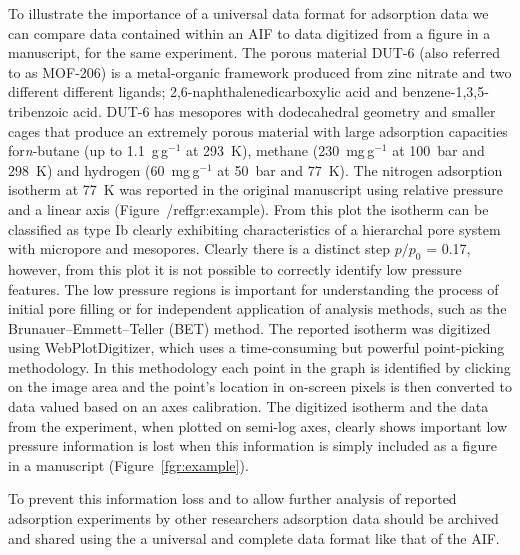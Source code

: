 \documentclass[journal=langd5,manuscript=article]{achemso}
\begin{document}
To illustrate the importance of a universal data format for adsorption data we can compare data contained within an AIF to data digitized from a figure in a manuscript, for the same experiment.
The porous material DUT-6 (also referred to as MOF-206) is a metal-organic framework produced from zinc nitrate and two different different ligands; 2,6-naphthalenedicarboxylic acid and benzene-1,3,5-tribenzoic acid.\cite{10.1002/anie.200904599}
DUT-6 has mesopores with dodecahedral geometry and smaller cages that produce an extremely porous material with large adsorption capacities for\textit{n}-butane (up to 1.1~g$\,$g$^{-1}$ at 293~K),  methane (230~mg$\,$g$^{-1}$ at 100~bar and 298~K) and hydrogen (60~mg$\,$g$^{-1}$ at 50~bar and 77~K).
The nitrogen adsorption isotherm at 77~K was reported in the original manuscript using relative pressure and a linear axis (Figure~/ref{fgr:example}).
From this plot the isotherm can be classified  as  type  Ib clearly exhibiting characteristics of a hierarchal pore system with micropore and mesopores.
Clearly there is a distinct step $p/p_0$ = 0.17, however, from this plot it is not possible to correctly identify low pressure features.
The low pressure regions is important for understanding the process of initial pore filling or for independent application of analysis methods, such as the Brunauer–Emmett–Teller (BET) method.
The reported isotherm was digitized using WebPlotDigitizer, which uses a time-consuming but powerful point-picking methodology.\cite{webplotdigitizer}
In this methodology each point in the graph is identified by clicking on the image area and the point's location in on-screen pixels is then converted to data valued based on an axes calibration.
The digitized isotherm and the data from the experiment, when plotted on semi-log axes, clearly shows important low pressure information is lost when this information is simply included as a figure in a manuscript (Figure~\ref{fgr:example}).

To prevent this information loss and to allow further analysis of reported adsorption experiments by other researchers adsorption data should be archived and shared using the a universal and complete data format like that of the AIF.
\end{document}
